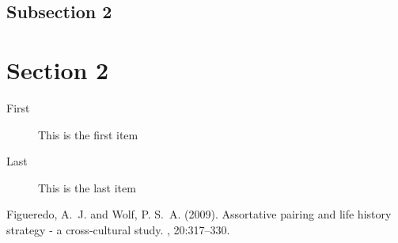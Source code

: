 \documentclass[DIV=calc, paper=a4, fontsize=11pt, twocolumn]{scrartcl}	 %
\begin{document}

\subsection*{Subsection 2}

\lipsum[7] %


\section*{Section 2}

\lipsum[8] %

\begin{description}
\item[First] This is the first item
\item[Last] This is the last item
\end{description}

\lipsum[9] %


\begin{thebibliography}{99} %

Figueredo, A.~J. and Wolf, P. S.~A. (2009).
\newblock Assortative pairing and life history strategy - a cross-cultural
  study.
, 20:317--330.
 
\end{thebibliography}

\end{document}
